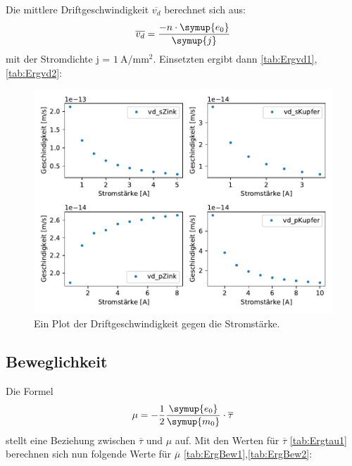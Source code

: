     Die mittlere Driftgeschwindigkeit $\overline{v_d}$ berechnet sich aus:
    \begin{equation}
        \overline{v_d} = \frac{-n \cdot \symup{e_0}}{\symup{j}} \nonumber
    \end{equation}
    mit der Stromdichte j = $\SI{1}{\ampere\per\milli\meter\squared}$.
    \noindent
    Einsetzten ergibt dann \ref{tab:Ergvd1},\ref{tab:Ergvd2}:
    \begin{figure}[H]
        \centering
        \includegraphics[width=1.1\textwidth]{build/Driftgeschwindigkeit.pdf}
        \caption{Ein Plot der Driftgeschwindigkeit gegen die Stromstärke.}
        \label{img:vd}
    \end{figure}


    \subsection{Beweglichkeit}


    Die Formel
    \begin{equation}
        \mu= -\frac{1}{2}\frac{\symup{e_0}}{\symup{m_0}}\cdot   \overline{\tau} \nonumber
    \end{equation}
    stellt eine Beziehung zwischen $\overline{\tau}$ und $\mu$ auf. Mit den Werten für $\overline{\tau}$ \ref{tab:Ergtau1} berechnen sich nun folgende Werte 
    für $\overline{\mu}$ \ref{tab:ErgBew1},\ref{tab:ErgBew2}:

